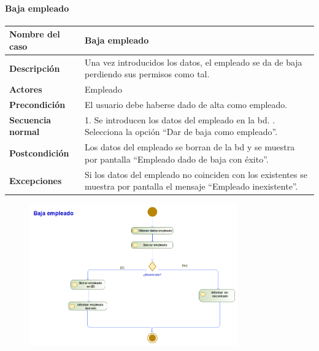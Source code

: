 \paragraph{Baja empleado}
\begin{table}[H]
	\centering
	\small
	\begin{tabularx}{0.8\textwidth}{|p{3.5cm}|X|}
		\hline
		\rowcolor{lightgray}
		\textbf{Nombre del caso}  & \textbf{Baja empleado}                                                                                                 \\
		\hline
		\textbf{Descripción}      & Una vez introducidos los datos, el empleado se da de baja perdiendo sus permisos como tal.                             \\
		\hline
		\textbf{Actores}          & Empleado                                                                                                               \\
		\hline
		\textbf{Precondición}     & El usuario debe haberse dado de alta como empleado.                                                                    \\
		\hline
		\textbf{Secuencia normal} & 1. Se introducen los datos del empleado en la \gls{bd}. \newline
		2. Selecciona la opción ``Dar de baja como empleado''.                                                                                             \\
		\hline
		\textbf{Postcondición}    & Los datos del empleado se borran de la \gls{bd} y se muestra por pantalla ``Empleado dado de baja con éxito''.         \\
		\hline
		\textbf{Excepciones}      & Si los datos del empleado no coinciden con los existentes se muestra por pantalla el mensaje ``Empleado inexistente''. \\
		\hline
	\end{tabularx}
\end{table}
\begin{figure}[H]
	\centering
	\includegraphics[width=0.8\textwidth]{Use_Cases/Baja empleado.png}
\end{figure}
\newpage
